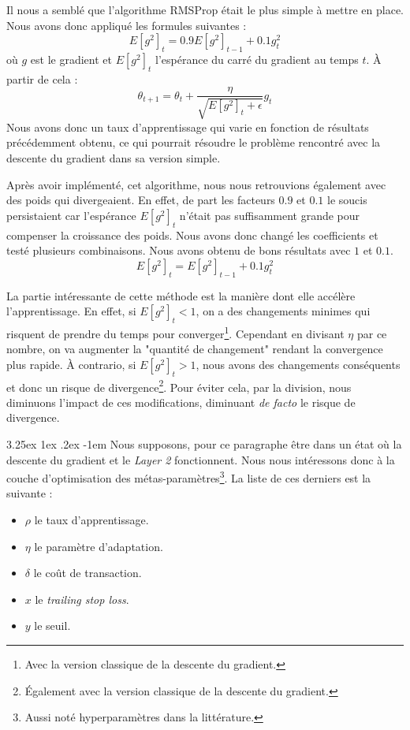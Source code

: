 \documentclass[a4paper, 11pt]{article}
\makeatletter
\renewcommand\paragraph{\@startsection{paragraph}{5}{\z@}%
  {3.25ex \@plus1ex \@minus.2ex}%
  {-1em}%
  {\normalfont\normalsize\bfseries}}
\makeatother
\begin{document}
  Il nous a semblé que l'algorithme RMSProp était le plus simple à mettre en place. Nous avons donc appliqué les formules suivantes \cite{rmsprop_algo} :
  $$E[g^2]_t = 0.9 E[g^2]_{t-1} + 0.1 g^2_t$$
  où $g$ est le gradient et $E[g^2]_t$ l'espérance du carré du gradient au temps $t$. À partir de cela :
  $$\theta_{t+1} = \theta_t + \frac{\eta}{\sqrt{E[g^2]_t + \epsilon}} g_t$$
  Nous avons donc un taux d'apprentissage qui varie en fonction de résultats précédemment obtenu, ce qui pourrait résoudre le problème rencontré avec la
  descente du gradient dans sa version simple.
  
  Après avoir implémenté, cet algorithme, nous nous retrouvions également avec des poids qui divergeaient. En effet, de part les facteurs $0.9$ et $0.1$ 
  le soucis persistaient car l'espérance $E[g^2]_t$ n'était pas suffisamment grande pour compenser la croissance des poids. Nous avons donc changé les 
  coefficients et testé plusieurs combinaisons. Nous avons obtenu de bons résultats avec $1$ et $0.1$.
  $$E[g^2]_t = E[g^2]_{t-1} + 0.1 g^2_t$$
  
  La partie intéressante de cette méthode est la manière dont elle accélère l'apprentissage. En effet, si $E[g^2]_t < 1$, on a des changements minimes 
  qui risquent de prendre du temps pour converger\footnote{Avec la version classique de la descente du gradient.}. Cependant en divisant $\eta$ par ce
  nombre, on va augmenter la "quantité de changement" rendant la convergence plus rapide. À contrario, si $E[g^2]_t > 1$, nous avons des changements 
  conséquents et donc un risque de divergence\footnote{Également avec la version classique de la descente du gradient.}. Pour éviter cela, par la division,
  nous diminuons l'impact de ces modifications, diminuant \textit{de facto} le risque de divergence.
  
  \paragraph{}
  Nous supposons, pour ce paragraphe être dans un état où la descente du gradient et le \textit{Layer 2} fonctionnent. Nous nous intéressons donc à la couche 
  d'optimisation des métas-paramètres\footnote{Aussi noté hyperparamètres dans la littérature.}. La liste de ces derniers est la suivante :
  \begin{itemize}
   \item $\rho$ le taux d'apprentissage.
   \item $\eta$ le paramètre d'adaptation.
   \item $\delta$ le coût de transaction.
   \item $x$ le \textit{trailing stop loss}.
   \item $y$ le seuil.
  \end{itemize}
\end{document}
